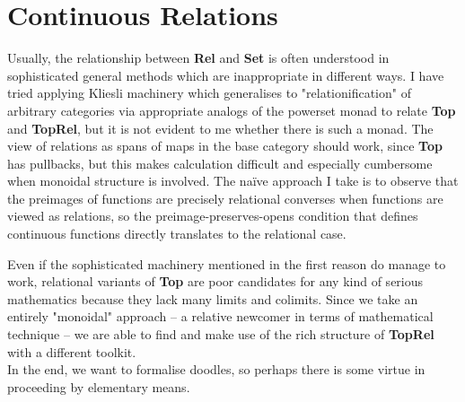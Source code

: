 \section{Continuous Relations}


 Usually, the relationship between \textbf{Rel} and \textbf{Set} is often understood in sophisticated general methods which are inappropriate in different ways. I have tried applying Kliesli machinery which generalises to "relationification" of arbitrary categories via appropriate analogs of the powerset monad to relate \textbf{Top} and \textbf{TopRel}, but it is not evident to me whether there is such a monad. The view of relations as spans of maps in the base category should work, since \textbf{Top} has pullbacks, but this makes calculation difficult and especially cumbersome when monoidal structure is involved. The na\"{i}ve approach I take is to observe that the preimages of functions are precisely relational converses when functions are viewed as relations, so the preimage-preserves-opens condition that defines continuous functions directly translates to the relational case.

 Even if the sophisticated machinery mentioned in the first reason do manage to work, relational variants of \textbf{Top} are poor candidates for any kind of serious mathematics because they lack many limits and colimits. Since we take an entirely "monoidal" approach -- a relative newcomer in terms of mathematical technique -- we are able to find and make use of the rich structure of \textbf{TopRel} with a different toolkit.\\

In the end, we want to formalise doodles, so perhaps there is some virtue in proceeding by elementary means.


